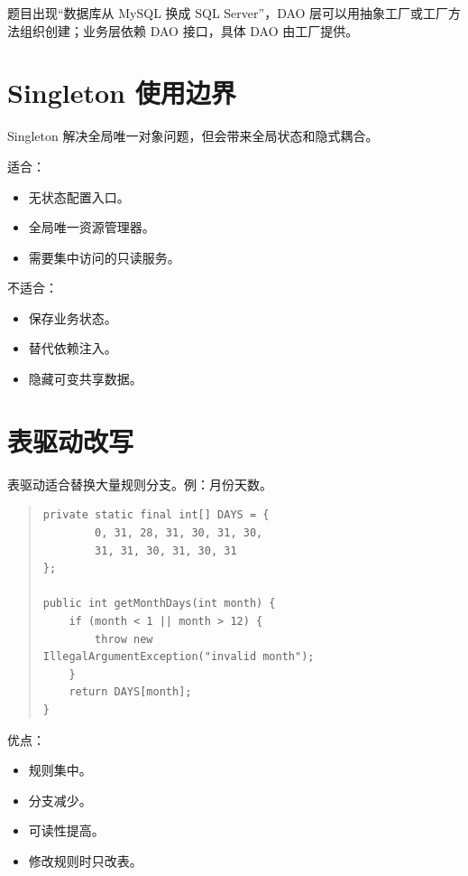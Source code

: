 \documentclass[UTF8,zihao=-4]{ctexart}
\begin{document}
题目出现“数据库从 MySQL 换成 SQL Server”，DAO 层可以用抽象工厂或工厂方法组织创建；业务层依赖 DAO 接口，具体 DAO 由工厂提供。

\section{Singleton 使用边界}

Singleton 解决全局唯一对象问题，但会带来全局状态和隐式耦合。

适合：

\begin{itemize}
\item 无状态配置入口。
\item 全局唯一资源管理器。
\item 需要集中访问的只读服务。
\end{itemize}

不适合：

\begin{itemize}
\item 保存业务状态。
\item 替代依赖注入。
\item 隐藏可变共享数据。
\end{itemize}

\section{表驱动改写}

表驱动适合替换大量规则分支。例：月份天数。

\begin{quote}
\footnotesize
\begin{verbatim}
private static final int[] DAYS = {
        0, 31, 28, 31, 30, 31, 30,
        31, 31, 30, 31, 30, 31
};

public int getMonthDays(int month) {
    if (month < 1 || month > 12) {
        throw new 
IllegalArgumentException("invalid month");
    }
    return DAYS[month];
}
\end{verbatim}
\end{quote}

优点：

\begin{itemize}
\item 规则集中。
\item 分支减少。
\item 可读性提高。
\item 修改规则时只改表。
\end{itemize}
\end{document}
